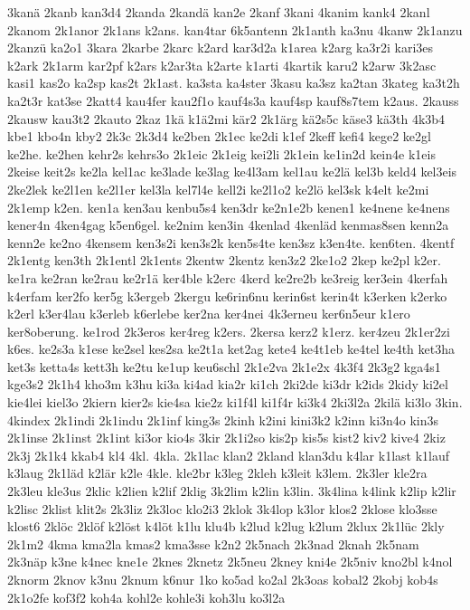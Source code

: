 {3kanä
2kanb
kan3d4
2kanda
2kandä
kan2e
2kanf
3kani
4kanim
kank4
2kanl
2kanom
2k1anor
2k1ans
k2ans.
kan4tar
6k5antenn
2k1anth
ka3nu
4kanw
2k1anzu
2kanzü
ka2o1
3kara
2karbe
2karc
k2ard
kar3d2a
k1area
k2arg
ka3r2i
kari3es
k2ark
2k1arm
kar2pf
k2ars
k2ar3ta
k2arte
k1arti
4kartik
karu2
k2arw
3k2asc
kasi1
kas2o
ka2sp
kas2t
2k1ast.
ka3sta
ka4ster
3kasu
ka3sz
ka2tan
3kateg
ka3t2h
ka2t3r
kat3se
2katt4
kau4fer
kau2f1o
kauf4s3a
kauf4sp
kauf8s7tem
k2aus.
2kauss
2kausw
kau3t2
2kauto
2kaz
1kä
k1ä2mi
kär2
2k1ärg
kä2s5c
käse3
kä3th
4k3b4
kbe1
kbo4n
kby2
2k3c
2k3d4
ke2ben
2k1ec
ke2di
k1ef
2keff
kefi4
kege2
ke2gl
ke2he.
ke2hen
kehr2s
kehrs3o
2k1eic
2k1eig
kei2li
2k1ein
ke1in2d
kein4e
k1eis
2keise
keit2s
ke2la
kel1ac
ke3lade
ke3lag
ke4l3am
kel1au
ke2lä
kel3b
keld4
kel3eis
2ke2lek
ke2l1en
ke2l1er
kel3la
kel7l4e
kell2i
ke2l1o2
ke2lö
kel3sk
k4elt
ke2mi
2k1emp
k2en.
ken1a
ken3au
kenbu5s4
ken3dr
ke2n1e2b
kenen1
ke4nene
ke4nens
kener4n
4ken4gag
k5en6gel.
ke2nim
ken3in
4kenlad
4kenläd
kenmas8sen
kenn2a
kenn2e
ke2no
4kensem
ken3s2i
ken3s2k
ken5s4te
ken3sz
k3en4te.
ken6ten.
4kentf
2k1entg
ken3th
2k1entl
2k1ents
2kentw
2kentz
ken3z2
2ke1o2
2kep
ke2pl
k2er.
ke1ra
ke2ran
ke2rau
ke2r1ä
ker4ble
k2erc
4kerd
ke2re2b
ke3reig
ker3ein
4kerfah
k4erfam
ker2fo
ker5g
k3ergeb
2kergu
ke6rin6nu
kerin6st
kerin4t
k3erken
k2erko
k2erl
k3er4lau
k3erleb
k6erlebe
ker2na
ker4nei
4k3erneu
ker6n5eur
k1ero
ker8oberung.
ke1rod
2k3eros
ker4reg
k2ers.
2kersa
kerz2
k1erz.
ker4zeu
2k1er2zi
k6es.
ke2s3a
k1ese
ke2sel
kes2sa
ke2t1a
ket2ag
kete4
ke4t1eb
ke4tel
ke4th
ket3ha
ket3s
ketta4s
kett3h
ke2tu
ke1up
keu6schl
2k1e2va
2k1e2x
4k3f4
2k3g2
kga4s1
kge3s2
2k1h4
kho3m
k3hu
ki3a
ki4ad
kia2r
ki1ch
2ki2de
ki3dr
k2ids
2kidy
ki2el
kie4lei
kiel3o
2kiern
kier2s
kie4sa
kie2z
ki1f4l
ki1f4r
ki3k4
2ki3l2a
2kilä
ki3lo
3kin.
4kindex
2k1indi
2k1indu
2k1inf
king3s
2kinh
k2ini
kini3k2
k2inn
ki3n4o
kin3s
2k1inse
2k1inst
2k1int
ki3or
kio4s
3kir
2k1i2so
kis2p
kis5s
kist2
kiv2
kive4
2kiz
2k3j
2k1k4
kkab4
kl4
4kl.
4kla.
2k1lac
klan2
2kland
klan3du
k4lar
k1last
k1lauf
k3laug
2k1läd
k2lär
k2le
4kle.
kle2br
k3leg
2kleh
k3leit
k3lem.
2k3ler
kle2ra
2k3leu
kle3us
2klic
k2lien
k2lif
2klig
3k2lim
k2lin
k3lin.
3k4lina
k4link
k2lip
k2lir
k2lisc
2klist
klit2s
2k3liz
2k3loc
klo2i3
2klok
3k4lop
k3lor
klos2
2klose
klo3sse
klost6
2klöc
2klöf
k2löst
k4löt
k1lu
klu4b
k2lud
k2lug
k2lum
2klux
2k1lüc
2kly
2k1m2
4kma
kma2la
kmas2
kma3sse
k2n2
2k5nach
2k3nad
2knah
2k5nam
2k3näp
k3ne
k4nec
kne1e
2knes
2knetz
2k5neu
2kney
kni4e
2k5niv
kno2bl
k4nol
2knorm
2knov
k3nu
2knum
k6nur
1ko
ko5ad
ko2al
2k3oas
kobal2
2kobj
kob4s
2k1o2fe
kof3f2
koh4a
kohl2e
kohle3i
koh3lu
ko3l2a
}
